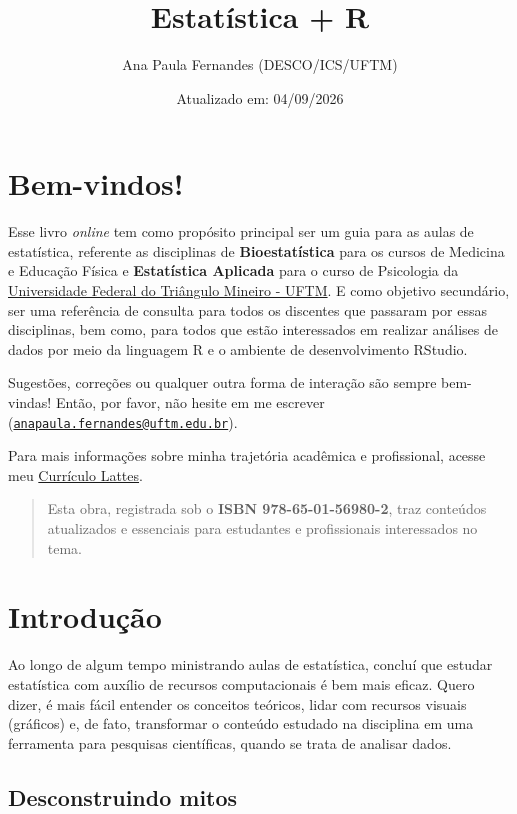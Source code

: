 \documentclass[
]{book}
\title{Estatística + R}
\author{Ana Paula Fernandes (DESCO/ICS/UFTM)}
\date{Atualizado em: 04/09/2026}
\begin{document}
\maketitle

{
\setcounter{tocdepth}{1}
\tableofcontents
}
\chapter{Bem-vindos!}\label{bem-vindos}

Esse livro \emph{online} tem como propósito principal ser um guia para as aulas de estatística, referente as disciplinas de \textbf{Bioestatística} para os cursos de Medicina e Educação Física e \textbf{Estatística Aplicada} para o curso de Psicologia da \href{http://www.uftm.edu.br}{Universidade Federal do Triângulo Mineiro - UFTM}. E como objetivo secundário, ser uma referência de consulta para todos os discentes que passaram por essas disciplinas, bem como, para todos que estão interessados em realizar análises de dados por meio da linguagem R e o ambiente de desenvolvimento RStudio.

Sugestões, correções ou qualquer outra forma de interação são sempre bem-vindas! Então, por favor, não hesite em me escrever (\href{mailto:anapaula.fernandes@uftm.edu.br}{\nolinkurl{anapaula.fernandes@uftm.edu.br}}).

Para mais informações sobre minha trajetória acadêmica e profissional, acesse meu \href{https://lattes.cnpq.br/5582801060910261}{Currículo Lattes}.

\begin{quote}
Esta obra, registrada sob o \textbf{ISBN 978-65-01-56980-2}, traz conteúdos atualizados e essenciais para estudantes e profissionais interessados no tema.
\end{quote}

\chapter{Introdução}\label{introduuxe7uxe3o}

Ao longo de algum tempo ministrando aulas de estatística, concluí que estudar estatística com auxílio de recursos computacionais é bem mais eficaz. Quero dizer, é mais fácil entender os conceitos teóricos, lidar com recursos visuais (gráficos) e, de fato, transformar o conteúdo estudado na disciplina em uma ferramenta para pesquisas científicas, quando se trata de analisar dados.

\section{Desconstruindo mitos}\label{desconstruindo-mitos}
\end{document}
